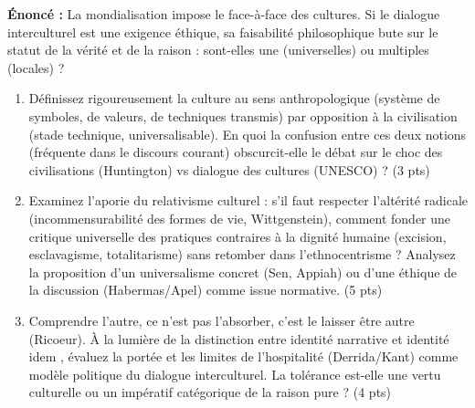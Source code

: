 \documentclass[11pt]{article}
\begin{document}
\begin{exercice}
\textbf{Énoncé :} La mondialisation impose le face-à-face des cultures. Si le dialogue interculturel est une exigence éthique, sa faisabilité philosophique bute sur le statut de la vérité et de la raison : sont-elles \og une \fg{} (universelles) ou \og multiples \fg{} (locales) ?

\begin{enumerate}
    \item Définissez rigoureusement la \og culture \fg{} au sens anthropologique (système de symboles, de valeurs, de techniques transmis) par opposition à la \og civilisation \fg{} (stade technique, universalisable). En quoi la confusion entre ces deux notions (fréquente dans le discours courant) obscurcit-elle le débat sur le \og choc des civilisations \fg{} (Huntington) vs \og dialogue des cultures \fg{} (UNESCO) ? (3 pts)
    \item Examinez l'aporie du relativisme culturel : s'il faut respecter l'altérité radicale (incommensurabilité des formes de vie, Wittgenstein), comment fonder une critique universelle des pratiques contraires à la dignité humaine (excision, esclavagisme, totalitarisme) sans retomber dans l'ethnocentrisme ? Analysez la proposition d'un \og universalisme concret \fg{} (Sen, Appiah) ou d'une \og éthique de la discussion \fg{} (Habermas/Apel) comme issue normative. (5 pts)
    \item \og Comprendre l'autre, ce n'est pas l'absorber, c'est le laisser être autre \fg{} (Ricoeur). À la lumière de la distinction entre \og identité narrative \fg{} et \og identité idem \fg{}, évaluez la portée et les limites de l'\og hospitalité \fg{} (Derrida/Kant) comme modèle politique du dialogue interculturel. La tolérance est-elle une vertu culturelle ou un impératif catégorique de la raison pure ? (4 pts)
\end{enumerate}
\end{exercice}
\end{document}
